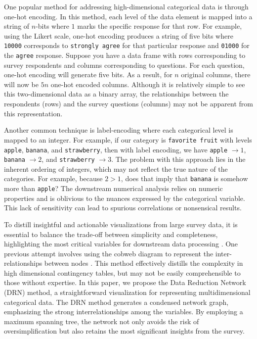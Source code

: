 One popular method for addressing high-dimensional categorical data is through one-hot encoding. In this method, each level of the data element is mapped into a string of $n$-bits where $1$ marks the specific response for that row. For example, using the Likert scale, one-hot encoding produces a string of five bits where \texttt{10000} corresponds to \texttt{strongly agree} for that particular response and \texttt{01000} for the \texttt{agree} response. Suppose you have a data frame with rows corresponding to survey respondents and columns corresponding to questions. For each question, one-hot encoding will generate five bits. As a result, for $n$ original columns, there will now be $5n$ one-hot encoded columns. Although it is relatively simple to see this two-dimensional data as a binary array, the relationships between the respondents (rows) and the survey questions (columns) may not be apparent from this representation.

Another common technique is label-encoding where each categorical level is mapped to an integer. For example, if our category is \texttt{favorite fruit} with levels \texttt{apple}, \texttt{banana}, and \texttt{strawberry}, then with label encoding, we have \texttt{apple} $\rightarrow 1$, \texttt{banana} $\rightarrow 2$, and \texttt{strawberry} $\rightarrow 3$. The problem with this approach lies in the inherent ordering of integers, which may not reflect the true nature of the categories. For example, because $2 > 1$, does that imply that \texttt{banana} is somehow more than \texttt{apple}? The downstream numerical analysis relies on numeric properties and is oblivious to the nuances expressed by the categorical variable. This lack of sensitivity can lead to spurious correlations or nonsensical results.

To distill insightful and actionable visualizations from large survey data, it is essential to balance the trade-off between simplicity and completeness, highlighting the most critical variables for downstream data processing \citep{wardlow2022perceptions}. One previous attempt involves using the cobweb diagram to represent the inter-relationships between nodes \citep{upton2000cobweb}. This method effectively distills the complexity in high dimensional contingency tables, but may not be easily comprehensible to those without expertise. In this paper, we propose the Data Reduction Network (DRN) method, a straightforward visualization for representing multidimensional categorical data. The DRN method generates a condensed network graph, emphasizing the strong interrelationships among the variables. By employing a maximum spanning tree, the network not only avoids the risk of oversimplification but also retains the most significant insights from the survey.

